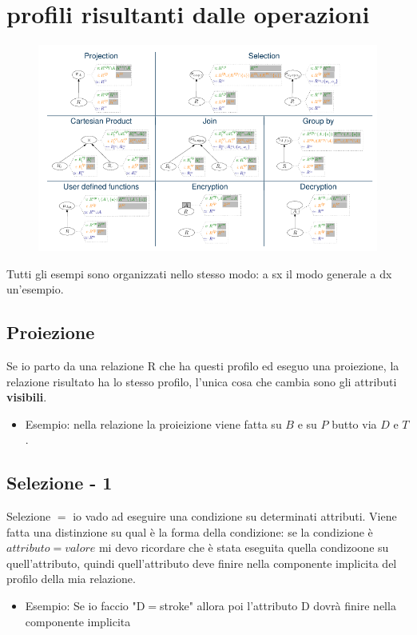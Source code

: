 \documentclass{report}
\begin{document}
\section{profili risultanti dalle operazioni}
\begin{figure}[H]
    \centering
    \includegraphics[width=1\linewidth]{images/risultatiOperazioni.png}
\end{figure}

\noindent Tutti gli esempi sono organizzati nello stesso modo: a sx il modo generale a dx un'esempio. 
\subsection{Proiezione}
Se io parto da una relazione R che ha questi profilo ed eseguo una proiezione, la relazione risultato ha lo stesso profilo, l'unica cosa che cambia sono gli attributi \textbf{visibili}.  
\begin{itemize}
    \item Esempio: nella relazione la proieizione viene fatta su $B$ e su $P$ butto via $D$ e $T$.
\end{itemize}

\subsection{Selezione - 1}
Selezione $=$ io vado ad eseguire una condizione su determinati attributi. Viene fatta una distinzione su qual è la forma della condizione:
se la condizione è $attributo = valore$ mi devo ricordare che è stata eseguita quella condizoone su quell'attributo, quindi quell'attributo deve finire nella componente implicita del profilo della mia relazione.
\begin{itemize}
    \item Esempio: Se io faccio "D$=$stroke" allora poi l'attributo D dovrà finire nella componente implicita
\end{itemize} 
\end{document}
